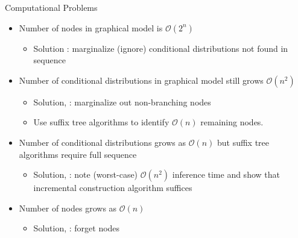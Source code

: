  \begin{frame}[t]{Computational Problems}
\begin{itemize}
\item Number of nodes in graphical model is $\mathcal{O}(2^n)$
\begin{itemize}
\item Solution : marginalize (ignore) conditional distributions not found in sequence
\end{itemize}
\item Number of conditional distributions in graphical model still grows $\mathcal{O}(n^2)$
\begin{itemize}
\item Solution, \citet{Wood2009} : marginalize out non-branching nodes \cite{Pitman1999, Ho2006}
\item Use suffix tree algorithms to identify  $\mathcal{O}(n)$ remaining nodes.
\end{itemize}
\item Number of conditional distributions grows as $\mathcal{O}(n)$ but suffix tree algorithms require full sequence
\begin{itemize}
\item Solution, \citet{Gasthaus2010} : note (worst-case) $\mathcal{O}(n^2)$ inference time and show that incremental construction algorithm suffices
\end{itemize}
\item Number of nodes grows as $\mathcal{O}(n)$
\begin{itemize}
\item Solution, \citet{Bartlett2010} : forget nodes 
\end{itemize}
\end{itemize}
\end{frame}


 
 
 
